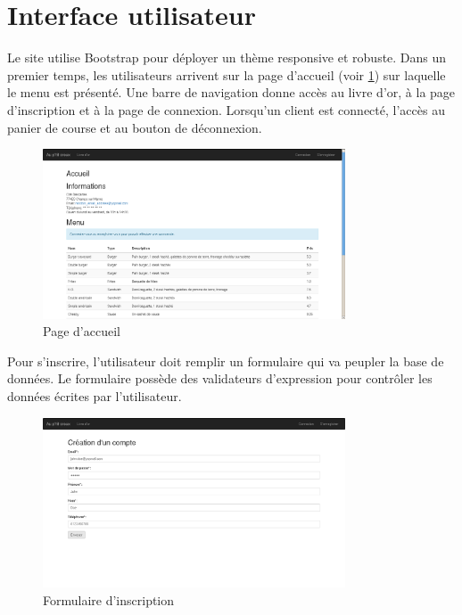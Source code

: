 \section{Interface utilisateur}

Le site utilise Bootstrap pour déployer un thème responsive et robuste.
Dans un premier temps, les utilisateurs arrivent sur la page d'accueil (voir
\ref{fig:index}) sur laquelle le menu est présenté. Une barre de navigation
donne accès au livre d'or, à la page d'inscription et à la page de connexion.
Lorsqu'un client est connecté, l'accès au panier de course et au bouton de
déconnexion.

\begin{figure}[H]
	\centering
	\includegraphics[width=0.8\textwidth]{res/index.png}
	\caption{Page d'accueil}
	\label{fig:index}
\end{figure}

Pour s'inscrire, l'utilisateur doit remplir un formulaire qui va peupler la
base de données. Le formulaire possède des validateurs d'expression pour
contrôler les données écrites par l'utilisateur.

\begin{figure}[H]
	\centering
	\includegraphics[width=0.8\textwidth]{res/formulaire_inscription.png}
	\caption{Formulaire d'inscription}
	\label{fig:signup}
\end{figure}

